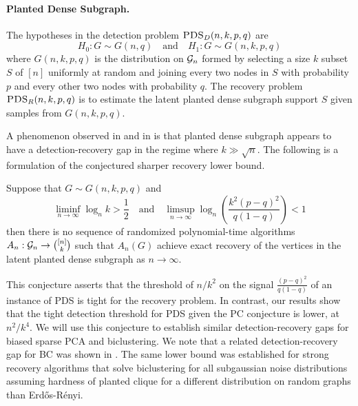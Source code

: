 \paragraph{Planted Dense Subgraph.} The hypotheses in the detection problem $\textsc{PDS}_D(n, k, p, q)$ are
$$H_0: G \sim G(n, q) \quad \text{and} \quad H_1 : G \sim G(n, k, p, q)$$
where $G(n, k, p, q)$ is the distribution on $\mathcal{G}_n$ formed by selecting a size $k$ subset $S$ of $[n]$ uniformly at random and joining every two nodes in $S$ with probability $p$ and every other two nodes with probability $q$. The recovery problem $\textsc{PDS}_R(n, k, p, q)$ is to estimate the latent planted dense subgraph support $S$ given samples from $G(n, k, p, q)$.

A phenomenon observed in \cite{hajek2015computational} and in \cite{chen2016statistical} is that planted dense subgraph appears to have a detection-recovery gap in the regime where $k \gg \sqrt{n}$. The following is a formulation of the conjectured sharper recovery lower bound.

\begin{conjecture} Suppose that $G \sim G(n, k, p, q)$ and
$$\liminf_{n \to \infty} \log_n k > \frac{1}{2} \quad \text{and} \quad \limsup_{n \to \infty} \log_n \left(\frac{k^2(p-q)^2}{q(1-q)} \right) < 1$$
then there is no sequence of randomized polynomial-time algorithms $A_n : \mathcal{G}_n \to \binom{[n]}{k}$ such that $A_n(G)$ achieve exact recovery of the vertices in the latent planted dense subgraph as $n \to \infty$.
\end{conjecture}

This conjecture asserts that the threshold of $n/k^2$ on the signal $\frac{(p-q)^2}{q(1 - q)}$ of an instance of PDS is tight for the recovery problem. In contrast, our results show that the tight detection threshold for PDS given the PC conjecture is lower, at $n^2/k^4$. We will use this conjecture to establish similar detection-recovery gaps for biased sparse PCA and biclustering. We note that a related detection-recovery gap for BC was shown in \cite{cai2015computational}. The same lower bound was established for strong recovery algorithms that solve biclustering for all subgaussian noise distributions assuming hardness of planted clique for a different distribution on random graphs than Erd\H{o}s-R\'{e}nyi.

